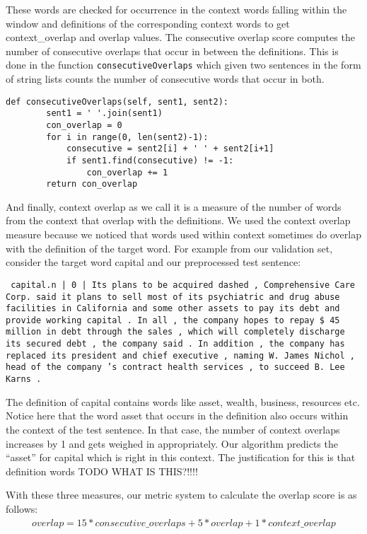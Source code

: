 \documentclass{article}
\begin{document}
These words are checked for occurrence in the context words falling within the window and definitions of the corresponding context words to get context\_overlap and overlap values. The consecutive overlap score computes the number of consecutive overlaps that occur in between the definitions. This is done in the function \texttt{consecutiveOverlaps} which given two sentences in the form of string lists counts the number of consecutive words that occur in both. 

\begin{verbatim}
def consecutiveOverlaps(self, sent1, sent2):
        sent1 = ' '.join(sent1)
        con_overlap = 0
        for i in range(0, len(sent2)-1):
            consecutive = sent2[i] + ' ' + sent2[i+1]
            if sent1.find(consecutive) != -1:
                con_overlap += 1
        return con_overlap
\end{verbatim}

And finally, context overlap as we call it is a measure of the number of words from the context that overlap with the definitions. We used the context overlap measure because we noticed that words used within context sometimes do overlap with the definition of the target word. For example from our validation set, consider the target word capital and our preprocessed test sentence:

\texttt{
capital.n | 0 | Its plans to be acquired dashed , Comprehensive Care Corp. said it plans to sell most of its psychiatric and drug abuse facilities in California and some other assets to pay its debt and provide working capital . In all , the company hopes to repay \$ 45 million in debt through the sales , which will completely discharge its secured debt , the company said . In addition , the company has replaced its president and chief executive , naming W. James Nichol , head of the company 's contract health services , to succeed B. Lee Karns .
}

The definition of capital contains words like asset, wealth, business, resources etc. Notice here that the word asset that occurs in the definition also occurs within the context of the test sentence. In that case, the number of context overlaps increases by 1 and gets weighed in appropriately. Our algorithm predicts the ``asset'' for capital which is right in this context. The justification for this is that definition words TODO WHAT IS THIS?!!!!

With these three measures, our metric system to calculate the overlap score is as follows:
\begin{align}
overlap = 15*consecutive\_overlaps + 5*overlap + 1*context\_overlap
\end{align}
\end{document}
